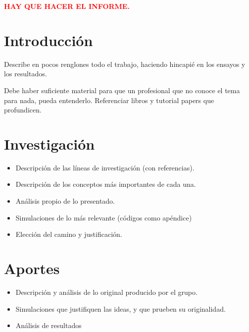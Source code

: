 









\begin{center}
	\Huge{\textcolor{red}{\textbf{HAY QUE HACER EL INFORME.}}}
\end{center}

\section{Introducción}
	Describe en pocos renglones todo el trabajo, haciendo hincapié en los ensayos y los resultados.
	
	Debe haber suficiente material para que un profesional que no conoce el tema para nada, pueda entenderlo. Referenciar libros y tutorial papers que profundicen.
	
\section{Investigación}
\begin{itemize}
	\item Descripción de las líneas de investigación (con referencias).
	\item Descripción de los conceptos más importantes de cada una.
	\item Análisis propio de lo presentado.
	\item Simulaciones de lo más relevante (códigos como apéndice)
	\item Elección del camino y justificación.
\end{itemize}

\section{Aportes}
\begin{itemize}
	\item Descripción y análisis de lo original producido por el grupo.
	\item Simulaciones que justifiquen las ideas, y que prueben su originalidad.
	\item Análisis de resultados
\end{itemize}

